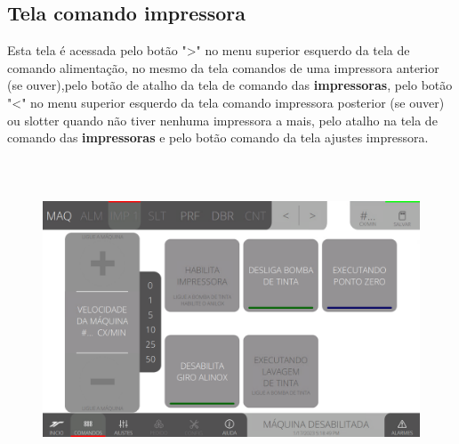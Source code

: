 \thispagestyle{fancy}
\vspace*{40 pt}
\subsection{Tela comando impressora}
 Esta tela é acessada pelo botão "\textgreater" no menu superior esquerdo da tela de comando alimentação, no mesmo da tela comandos de uma impressora anterior (se ouver),pelo botão de atalho da tela de comando das
\textbf{impressoras}, pelo botão "\textless{}" no menu superior esquerdo da tela comando impressora posterior (se ouver) ou slotter quando não tiver nenhuma impressora a mais, pelo atalho na tela de comando das \textbf{impressoras} e pelo botão comando da tela ajustes impressora.
\vspace*{\fill}
\begin{figure}[h]
  \centering
  \includegraphics[width=576px,height=360px]{src/imagesFlexo/04-printter/02-printter/commands/e-Tela-Principal.png}
\end{figure}
\vspace*{\fill}

\newpage
\thispagestyle{fancy}
\vspace*{40 pt}
